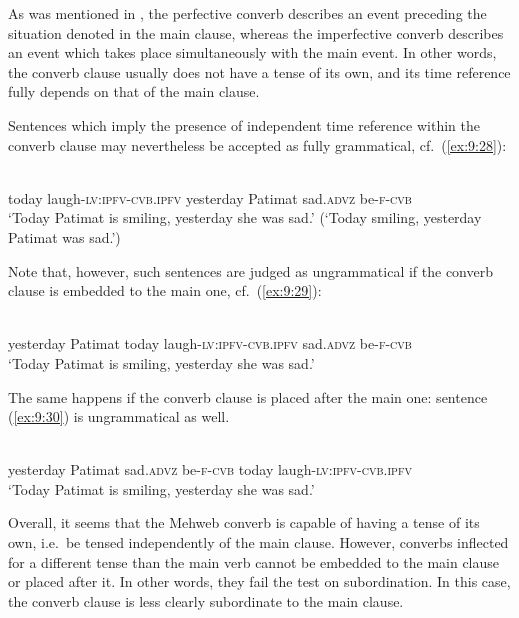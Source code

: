 ﻿\documentclass[output=paper]{langsci/langscibook}
\begin{document}

As was mentioned in , the perfective converb describes an
event preceding the situation denoted in the main clause, whereas
the imperfective converb describes an event which takes place
simultaneously with the main event. In other words, the
converb clause usually does not have a tense of its own, and its time
reference fully depends on that of the main clause.

Sentences which imply the presence of independent time reference within
the converb clause may nevertheless be accepted as fully grammatical,
cf.\ (\ref{ex:9:28}):

\pagebreak

\ea \label{ex:9:28} %
\\
today laugh-\textsc{lv}:\textsc{ipfv}-\textsc{cvb.ipfv} yesterday Patimat sad.\textsc{advz} {be}-\textsc{f}-\textsc{cvb}\\\unskip
\glt `Today Patimat is smiling, yesterday she was sad.' (`Today smiling,
yesterday Patimat was sad.')
\z

Note that, however, such sentences are judged as ungrammatical if the
converb clause is embedded to the main one, cf.\ (\ref{ex:9:29}):

\ea \label{ex:9:29} %
\\
yesterday Patimat today laugh-\textsc{lv}:\textsc{ipfv}-\textsc{cvb.ipfv} sad.\textsc{advz} {be}-\textsc{f}-\textsc{cvb}\\\unskip
\glt `Today Patimat is smiling, yesterday she was sad.'
\z

The same happens if the converb clause is placed after the main one:
sentence (\ref{ex:9:30}) is ungrammatical as well.

\ea \label{ex:9:30} %
\\
yesterday Patimat sad.\textsc{advz} {be}-\textsc{f}-\textsc{cvb} today laugh-\textsc{lv}:\textsc{ipfv}-\textsc{cvb.ipfv}\\\unskip
\glt `Today Patimat is smiling, yesterday she was sad.'
\z

Overall, it seems that the Mehweb converb is capable of having a tense
of its own, i.e.\ be tensed independently of the main clause. However,
converbs inflected for a different tense than the main verb cannot be
embedded to the main clause or placed after it. In other words, they
fail the test on subordination. In this case, the converb clause is less
clearly subordinate to the main clause.
%
\end{document}
